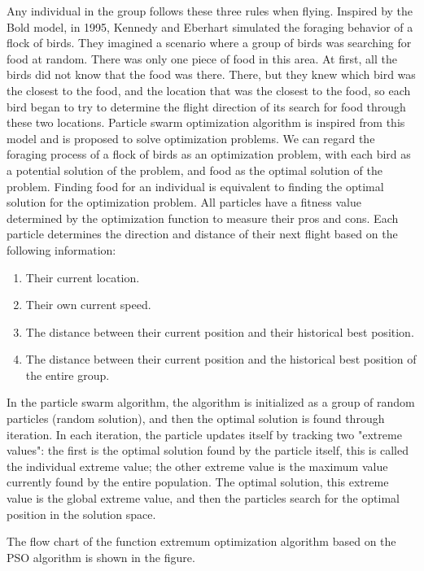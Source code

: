 \documentclass[12pt]{article}  %
\begin{document}
Any individual in the group follows these three rules when flying. Inspired by the Bold model, in 1995, Kennedy and Eberhart simulated the foraging behavior of a flock of birds. They imagined a scenario where a group of birds was searching for food at random. There was only one piece of food in this area. At first, all the birds did not know that the food was there. There, but they knew which bird was the closest to the food, and the location that was the closest to the food, so each bird began to try to determine the flight direction of its search for food through these two locations. Particle swarm optimization algorithm is inspired from this model and is proposed to solve optimization problems. We can regard the foraging process of a flock of birds as an optimization problem, with each bird as a potential solution of the problem, and food as the optimal solution of the problem. Finding food for an individual is equivalent to finding the optimal solution for the optimization problem. All particles have a fitness value determined by the optimization function to measure their pros and cons. Each particle determines the direction and distance of their next flight based on the following information:

\begin{enumerate}[\bfseries 1.]
    \item Their current location. 
    \item Their own current speed.
    \item The distance between their current position and their historical best position.
    \item The distance between their current position and the historical best position of the entire group.
\end{enumerate}

In the particle swarm algorithm, the algorithm is initialized as a group of random particles (random solution), and then the optimal solution is found through iteration. In each iteration, the particle updates itself by tracking two "extreme values": the first is the optimal solution found by the particle itself, this is called the individual extreme value; the other extreme value is the maximum value currently found by the entire population. The optimal solution, this extreme value is the global extreme value, and then the particles search for the optimal position in the solution space.

The flow chart of the function extremum optimization algorithm based on the PSO algorithm is shown in the figure.
\end{document}
